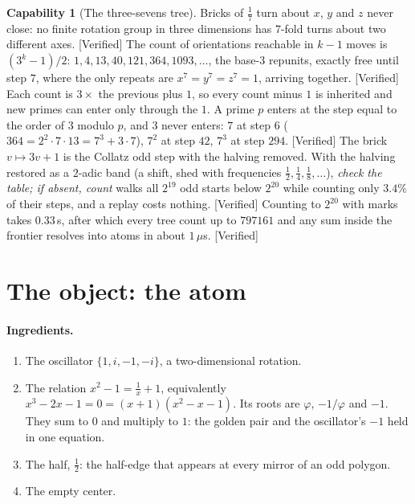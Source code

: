 \documentclass[11pt]{article}
\newcommand{\verified}{\textsf{\small\textcolor{verif}{[Verified]}}}
\theoremstyle{definition}\newtheorem{claim}{Capability}
\theoremstyle{remark}
\begin{document}
\begin{claim}[The three-sevens tree]\label{c:tree}
Bricks of $\tfrac17$ turn about $x$, $y$ and $z$ never close: no finite rotation group in three dimensions has $7$-fold turns about two different axes. \verified{} The count of orientations reachable in $k-1$ moves is $(3^k-1)/2$: $1,4,13,40,121,364,1093,\dots$, the base-$3$ repunits, exactly free until step $7$, where the only repeats are $x^7=y^7=z^7=1$, arriving together. \verified{} Each count is $3\times$ the previous plus $1$, so every count minus $1$ is inherited and new primes can enter only through the $1$. A prime $p$ enters at the step equal to the order of $3$ modulo $p$, and $3$ never enters: $7$ at step $6$ ($364=2^2\cdot7\cdot13=7^3+3\cdot7$), $7^2$ at step $42$, $7^3$ at step $294$. \verified{} The brick $v\mapsto3v+1$ is the Collatz odd step with the halving removed. With the halving restored as a $2$-adic band (a shift, shed with frequencies $\tfrac12,\tfrac14,\tfrac18,\dots$), \emph{check the table; if absent, count} walks all $2^{19}$ odd starts below $2^{20}$ while counting only $3.4\%$ of their steps, and a replay costs nothing. \verified{} Counting to $2^{20}$ with marks takes $0.33$\,s, after which every tree count up to $797161$ and any sum inside the frontier resolves into atoms in about $1\,\mu$s. \verified{}
\end{claim}

\section{The object: the atom}
\paragraph{Ingredients.}
\begin{enumerate}[nosep]
\item The oscillator $\{1,i,-1,-i\}$, a two-dimensional rotation.
\item The relation $x^2-1=\tfrac1x+1$, equivalently $x^3-2x-1=0=(x+1)(x^2-x-1)$. Its roots are $\varphi$, $-1/\varphi$ and $-1$. They sum to $0$ and multiply to $1$: the golden pair and the oscillator's $-1$ held in one equation.
\item The half, $\tfrac12$: the half-edge that appears at every mirror of an odd polygon.
\item The empty center.
\end{enumerate}
\end{document}
